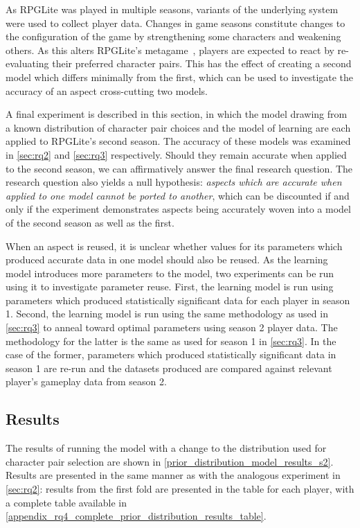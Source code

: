 As RPGLite was played in multiple seasons, variants of the underlying system
were used to collect player data. Changes in game seasons constitute changes to
the configuration of the game by strengthening some characters and weakening
others. As this alters RPGLite's metagame~\cite{kavanagh2021thesis}, players are
expected to react by re-evaluating their preferred character pairs. This has the
effect of creating a second model which differs minimally from the first, which
can be used to investigate the accuracy of an aspect cross-cutting two models.

A final experiment is described in this section, in which the model drawing from
a known distribution of character pair choices and the model of learning are
each applied to RPGLite's second season. The accuracy of these models was
examined in \cref{sec:rq2} and \cref{sec:rq3} respectively. Should they remain
accurate when applied to the second season, we can affirmatively answer the
final research question. The research question also yields a null hypothesis:
\emph{aspects which are accurate when applied to one model cannot be ported to
another}, which can be discounted if and only if the experiment
demonstrates aspects being accurately woven into a model of the second season as
well as the first. 

When an aspect is reused, it is unclear whether values for its parameters which
produced accurate data in one model should also be reused. As the learning model
introduces more parameters to the model, two experiments can be run using it to
investigate parameter reuse. First, the learning model is run using parameters
which produced statistically significant data for each player in season 1.
Second, the learning model is run using the same methodology as used in
\cref{sec:rq3} to anneal toward optimal parameters using season 2 player data.
The methodology for the latter is the same as used for season 1 in
\cref{sec:rq3}. In the case of the former, parameters which produced
statistically significant data in season 1 are re-run and the datasets produced
are compared against relevant player's gameplay data from season 2.


\subsection{Results}

The results of running the model with a change to the distribution used for
character pair selection are shown in
\cref{prior_distribution_model_results_s2}. Results are presented in the same
manner as with the analogous experiment in \cref{sec:rq2}: results from the
first fold are presented in the table for
each player, with a complete table available in
\cref{appendix_rq4_complete_prior_distribution_results_table}.

